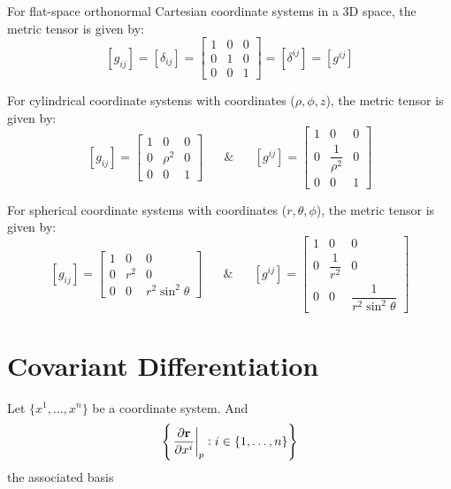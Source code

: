  For flat-space orthonormal Cartesian coordinate systems
in a 3D space, the metric tensor is given by:
\begin{equation}
\left[g_{ij}\right]=\left[\delta_{ij}\right]=\left[\begin{array}{ccc}
1 & 0 & 0\\
0 & 1 & 0\\
0 & 0 & 1
\end{array}\right]=\left[\delta^{ij}\right]=\left[g^{ij}\right]
\end{equation}


 For cylindrical coordinate systems with coordinates ($\rho,\phi,z$),
the metric tensor is given by:
\begin{equation}
\left[g_{ij}\right]=\left[\begin{array}{ccc}
1 & 0 & 0\\
0 & \rho^{2} & 0\\
0 & 0 & 1
\end{array}\right]\,\,\,\,\,\,\,\,\,\,\&\,\,\,\,\,\,\,\,\,\,\left[g^{ij}\right]
=\left[\begin{array}{ccc}
1 & 0 & 0\\
0 & \dfrac{1}{\rho^{2}} & 0\\
0 & 0 & 1
\end{array}\right]
\end{equation}


 For spherical coordinate systems with coordinates ($r,\theta,\phi$),
the metric tensor is given by:
\begin{equation}
\left[g_{ij}\right]=\left[\begin{array}{ccc}
1 & 0 & 0\\
0 & r^{2} & 0\\
0 & 0 & r^{2}\sin^{2}\theta
\end{array}\right]\,\,\,\,\,\,\,\,\,\,\&\,\,\,\,\,\,\,\,\,\,\left[g^{ij}\right]
=\left[\begin{array}{ccc}
1 & 0 & 0\\
0 & \dfrac{1}{r^{2}} & 0\\
0 & 0 & \dfrac{1}{r^{2}\sin^{2}\theta}
\end{array}\right]
\end{equation}





\section{Covariant Differentiation\label{secCovariantDifferentiation}}
Let $\{x^1,  \dots, x^n\}$ be a coordinate system. And 
\[\left\lbrace \left. \dfrac{\partial\mathbf{ r}}{\partial x^i} \right|_p : i \in \lbrace1, \dots, n\rbrace\right\rbrace\]
 the associated basis 

